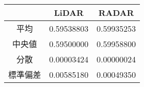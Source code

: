 \begin{tabular}{crr}
\hline
        & \multicolumn{1}{c}{LiDAR} & \multicolumn{1}{c}{RADAR} \\
\hline
\hline
平均    & 0.59538803 & 0.59935253 \\
\hline
中央値   & 0.59500000 & 0.59958800 \\
\hline
分散    & 0.00003424 & 0.00000024 \\
\hline
標準偏差  & 0.00585180 & 0.00049350 \\
\hline
\end{tabular}
